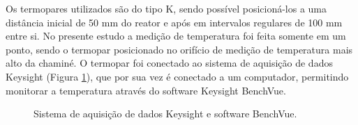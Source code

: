 Os termopares utilizados são do tipo K, sendo possível posicioná-los a uma distância inicial de 50 mm do reator e após em intervalos regulares de 100 mm entre si. No presente estudo a medição de temperatura foi feita somente em um ponto, sendo o termopar posicionado no orifício de medição de temperatura mais alto da chaminé. O termopar foi conectado ao sistema de aquisição de dados Keysight (Figura \ref{fig:keysight}), que por sua vez é conectado a um computador, permitindo monitorar a temperatura através do software Keysight BenchVue.

\begin{figure}[!ht]
	\centering
	\caption{Sistema de aquisição de dados Keysight e software BenchVue.}
	\label{fig:keysight}
\end{figure}

